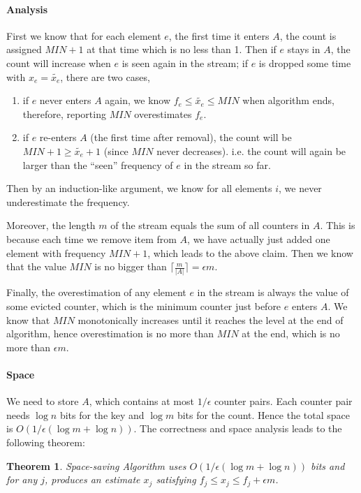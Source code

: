 \documentclass[11pt]{article}
\theoremstyle{plain}
\newtheorem{theorem}{Theorem}[section]
\begin{document}
\paragraph{Analysis} First we know that for each element $e$, the first time it 
enters $A$, the count is assigned $MIN+1$ at that time which is no less than 1. 
Then if $e$ stays in $A$, the count will increase when $e$ is seen again in the 
stream; if $e$ is dropped some time with $x_e=\tilde{x_e}$, there are two cases, 
\begin{enumerate}
	\item if $e$ never enters $A$ again, we know $f_e\leq \tilde{x_e} \leq MIN$ 
	when algorithm ends, therefore, reporting $MIN$ overestimates $f_e$.
	\item if $e$ re-enters $A$ (the first time after removal), the count will be 
	$MIN+1\geq  \tilde{x_e}+1$ (since $MIN$ never decreases). i.e. the count will 
	again be larger than the ``seen'' frequency of $e$ in the stream so far.
\end{enumerate}
Then by an induction-like argument, we know for all elements $i$, we never 
underestimate the frequency. 

Moreover, the length $m$ of the stream equals 
the sum of all counters in $A$. This is because each time we remove item from 
$A$, we have actually just added one element with frequency $MIN+1$, which 
leads to the above claim.  Then we know that the value $MIN$ is no bigger than 
$\lceil \frac{m}{|A|}\rceil=\epsilon m$. 

Finally, the overestimation of any element $e$ in the stream is always the value 
of some evicted counter, which is the minimum counter just before $e$ enters 
$A$. We know that $MIN$ monotonically increases until it reaches the level at 
the end of algorithm, hence overestimation is no more than $MIN$ at the end, 
which is no more than $\epsilon m$. 

\paragraph{Space} We need to store $A$, which contains at most $1/\epsilon$ 
counter pairs. Each counter pair needs $\log n$ bits for the key and $\log m$ 
bits 
for the count. Hence the total space is $O(1/\epsilon(\log m +\log n))$. The 
correctness and space analysis leads to the following theorem:

\begin{theorem}
	Space-saving Algorithm uses $O(1/\epsilon(\log m +\log n))$ bits and for any 
	$j$, 
	produces an estimate $x_j$ satisfying $f_j \leq x_j \leq f_j+\epsilon m$. 
\end{theorem}
\end{document}
